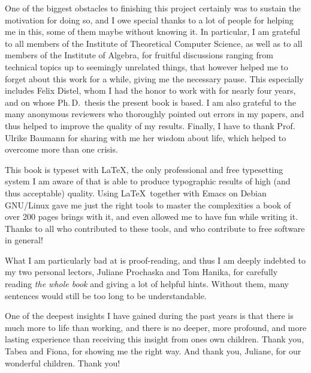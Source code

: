 One of the biggest obstacles to finishing this project certainly was to sustain the
motivation for doing so, and I owe special thanks to a lot of people for helping me in
this, some of them maybe without knowing it.  In particular, I am grateful to all members
of the Institute of Theoretical Computer Science, as well as to all members of the
Institute of Algebra, for fruitful discussions ranging from technical topics up to
seemingly unrelated things, that however helped me to forget about this work for a while,
giving me the necessary pause.  This especially includes Felix Distel, whom I had the
honor to work with for nearly four years, and on whose Ph.\,D.\, thesis the present book
is based.  I am also grateful to the many anonymous reviewers who thoroughly pointed out
errors in my papers, and thus helped to improve the quality of my results.  Finally, I
have to thank Prof.\,Ulrike Baumann for sharing with me her wisdom about life, which
helped to overcome more than one crisis.

This book is typeset with \LaTeX, the only professional and free typesetting system I am
aware of that is able to produce typographic results of high (and thus acceptable)
quality.  Using \LaTeX\ together with Emacs on Debian GNU/Linux gave me just the right
tools to master the complexities a book of over 200 pages brings with it, and even allowed
me to have fun while writing it.  Thanks to all who contributed to these tools, and who
contribute to free software in general!

What I am particularly bad at is proof-reading, and thus I am deeply indebted to my two
personal lectors, Juliane Prochaska and Tom Hanika, for carefully reading \emph{the whole
  book} and giving a lot of helpful hints.  Without them, many sentences would still be
too long to be understandable.

One of the deepest insights I have gained during the past years is that there is much more
to life than working, and there is no deeper, more profound, and more lasting experience
than receiving this insight from ones own children.  Thank you, Tabea and Fiona, for
showing me the right way.  And thank you, Juliane, for our wonderful children.  Thank you!


